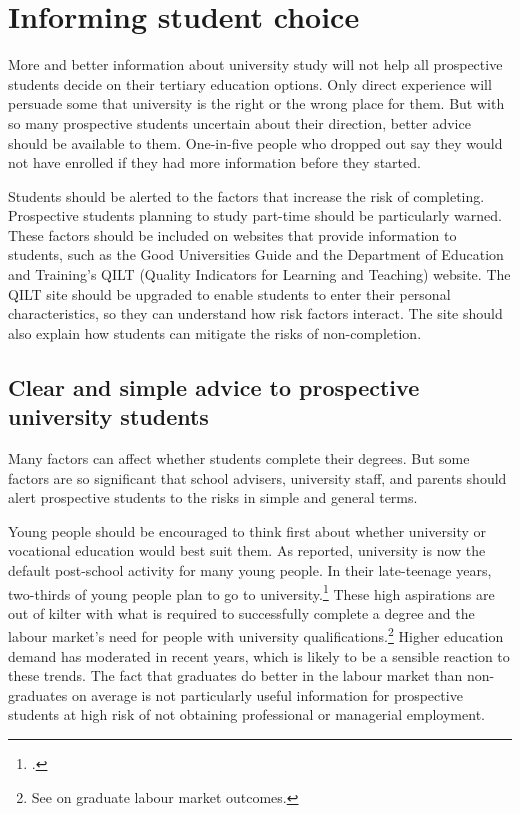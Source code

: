 \chapter{Informing student choice}\label{chap:5}

More and better information about university study will not help all prospective students decide on their tertiary education options. Only direct experience will persuade some that university is the right or the wrong place for them. But with so many prospective students uncertain about their direction, better advice should be available to them. One-in-five people who dropped out say they would not have enrolled if they had more information before they started.

Students should be alerted to the factors that increase the risk of completing. Prospective students planning to study part-time should be particularly warned. These factors should be included on websites that provide information to students, such as the Good Universities Guide and the Department of Education and Training's QILT (Quality Indicators for Learning and Teaching) website. The QILT site should be upgraded to enable students to enter their personal characteristics, so they can understand how risk factors interact. The site should also explain how students can mitigate the risks of non-completion.

\section{Clear and simple advice to prospective university students}\label{sec:5.1}

Many factors can affect whether students complete their degrees. But some factors are so significant that school advisers, university staff, and parents should alert prospective students to the risks in simple and general terms.

Young people should be encouraged to think first about whether university or vocational education would best suit them. As  reported, university is now the default post-school activity for many young people. In their late-teenage years, two-thirds of young people plan to go to university.\footcite[][16]{MissionAustralia2016} 
These high aspirations are out of kilter with what is required to successfully complete a degree and the labour market's need for people with university qualifications.\footnote{See \textcite{Norton2017c} on graduate labour market outcomes.} Higher education demand has moderated in recent years, which is likely to be a sensible reaction to these trends. The fact that graduates do better in the labour market than non-graduates on average is not particularly useful information for prospective students at high risk of not obtaining professional or managerial employment.

